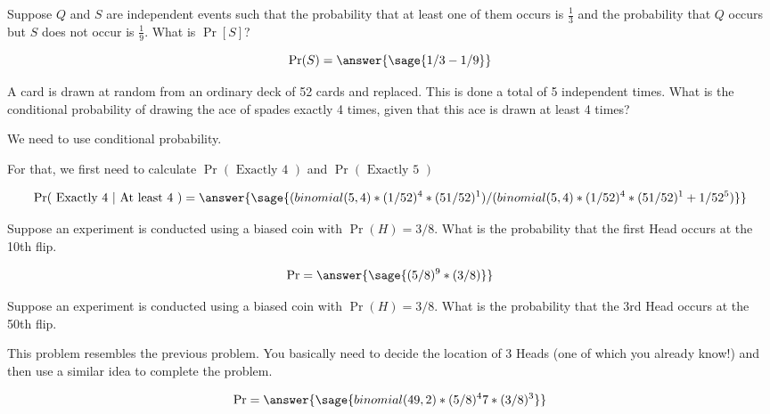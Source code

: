 \documentclass{ximera}
\begin{document}
\begin{problem}
Suppose $Q$ and $S$ are independent events such that the probability that at least one of them occurs is $\frac{1}{3}$ and the probability that $Q$ occurs but $S$ does not occur is $\frac{1}{9}$. What is $\Pr[S]$?

\begin{prompt}
$$\Pr(S)=\answer{\sage{1/3-1/9}}$$
\end{prompt}

\end{problem}

\begin{problem}
A card is drawn at random from an ordinary deck of 52 cards and replaced. This is done a total of 5 independent times. What is the conditional probability of drawing the ace of spades exactly 4 times, given that this ace is drawn at least 4 times?
\begin{hint}
    \item We need to use conditional probability.
    \item For that, we first need to calculate 
$
\Pr(\text{ Exactly 4 })$
and
$
\Pr(\text{ Exactly 5 })
$
\end{hint}

\begin{prompt}
$$
\Pr(\text{ Exactly 4 } | \text{ At least 4 })
=
\answer{
\sage{(binomial(5,4)*(1/52)^4*(51/52)^1)/(binomial(5,4)*(1/52)^4*(51/52)^1+1/52^5)}
}
$$
\end{prompt}

\end{problem}

\begin{problem}
Suppose an experiment is conducted using a biased coin with $\Pr(H)=3/8$. What is the probability that the first Head occurs at the 10th flip.

\begin{prompt}
$$
\Pr=\answer{\sage{(5/8)^9*(3/8)}}
$$
\end{prompt}

\end{problem}

\begin{problem}
Suppose an experiment is conducted using a biased coin with $\Pr(H)=3/8$. What is the probability that the 3rd Head occurs at the 50th flip.
\begin{hint}
This problem resembles the previous problem. You basically need to decide the location of 3 Heads (one of which you already know!) and then use a similar idea to complete the problem.
\end{hint}
\begin{prompt}
$$
\Pr=\answer{\sage{binomial(49,2)*(5/8)^47*(3/8)^3}}
$$
\end{prompt}

\end{problem}
\end{document}
